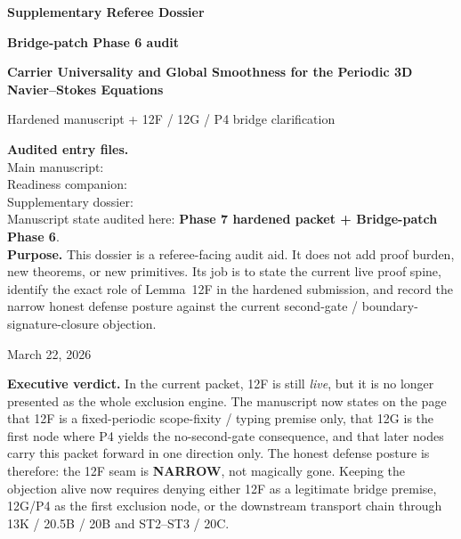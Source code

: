 \documentclass[11pt,letterpaper]{article}
\newcommand{\narrow}{\textcolor{Warn}{\textbf{NARROW}}}
\begin{document}

\begin{titlepage}
\centering
\vspace*{1.1cm}
{\Large\color{Accent}\bfseries Supplementary Referee Dossier\par}
\vspace{0.35cm}
{\LARGE\bfseries Bridge-patch Phase 6 audit\par}
\vspace{0.25cm}
{\Large\bfseries Carrier Universality and Global Smoothness for the Periodic 3D Navier--Stokes Equations\par}
\vspace{0.25cm}
{\large Hardened manuscript + 12F / 12G / P4 bridge clarification\par}
\vspace{0.8cm}

\begin{tcolorbox}[width=0.93\textwidth,colback=Light,colframe=Accent,boxrule=1pt]
\small
\textbf{Audited entry files.}\\[-0.1em]
\footnotesize Main manuscript: \\
Readiness companion: \\
Supplementary dossier: \\[0.35em]
\small Manuscript state audited here: \textbf{Phase 7 hardened packet + Bridge-patch Phase 6}.\\[0.35em]
\textbf{Purpose.} This dossier is a referee-facing audit aid. It does not add proof burden, new theorems, or new primitives. Its job is to state the current live proof spine, identify the exact role of Lemma~12F in the hardened submission, and record the narrow honest defense posture against the current second-gate / boundary-signature-closure objection.
\end{tcolorbox}

\vfill
{\large March 22, 2026\par}
\end{titlepage}
\clearpage
{}

\begin{verdictbox}
\textbf{Executive verdict.} In the current packet, 12F is still \emph{live}, but it is no longer presented as the whole exclusion engine. The manuscript now states on the page that 12F is a fixed-periodic scope-fixity / typing premise only, that 12G is the first node where P4 yields the no-second-gate consequence, and that later nodes carry this packet forward in one direction only. The honest defense posture is therefore: the 12F seam is \narrow{}, not magically gone. Keeping the objection alive now requires denying either 12F as a legitimate bridge premise, 12G/P4 as the first exclusion node, or the downstream transport chain through 13K / 20.5B / 20B and ST2--ST3 / 20C.
\end{verdictbox}
\end{document}
